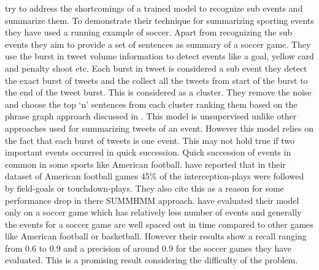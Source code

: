 \citet{Nichols:2012:SSE:2166966.2166999} try to address the shortcomings of a trained model to recognize sub events and summarize them. To demonstrate their technique for summarizing sporting events they have used a running example of soccer. Apart from recognizing the sub events they aim to provide a set of sentences as summary of a soccer game. They use the burst in tweet volume information to detect  events like a goal, yellow card and penalty shoot etc. Each burst in tweet is considered a sub event they detect the exact burst of tweets and the collect all the tweets from start of the burst to the end of the tweet burst. This is considered as a cluster. They remove the noise and choose the top ‘n’ sentences from each cluster ranking them based on the phrase graph approach discussed in \citet{Sharifi:2010:SMA:1857999.1858099}. This model is unsupervised unlike other approaches used for summarizing tweets of an event. However this model relies on the fact that each burst of tweets is one event. This may not hold true if two important events occurred in quick succession. Quick succession of events in common in some sports like American football. \citet{DBLP:conf/icwsm/ChakrabartiP11} have reported that in their dataset of American football games 45\% of the interception-plays were followed by field-goals or touchdown-plays. They also cite this as a reason for some performance drop in there SUMMHMM approach.  \citet{Nichols:2012:SSE:2166966.2166999} have evaluated their model only on a soccer game which has relatively less number of events and generally the events for a soccer game are well spaced out in time compared to other games like American football or basketball. However their results show a recall ranging from 0.6 to 0.9 and a precision of around 0.9 for the soccer games they have evaluated. This is a promising result considering the difficulty of the problem.

